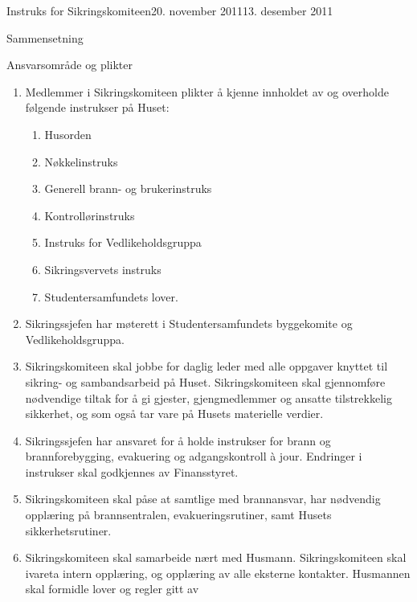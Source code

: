 \documentclass[../fsbok.tex]{subfiles}
\begin{document}
\begin{instruks}{Instruks for Sikringskomiteen}{20. november 2011}{13. desember 2011}
\begin{instruksledd}{Sammensetning}
\begin{enumerate}
	
        \end{enumerate}
    \end{instruksledd}

    \begin{instruksledd}{Ansvarsområde og plikter}
        \begin{enumerate}
            \item Medlemmer i Sikringskomiteen plikter å kjenne innholdet av og overholde
                følgende instrukser på Huset:
                \begin{enumerate}
                    \item Husorden
		    \item Nøkkelinstruks
                    \item Generell brann- og brukerinstruks 
                    \item Kontrollørinstruks
                    \item Instruks for Vedlikeholdsgruppa
                    \item Sikringsvervets instruks
                    \item Studentersamfundets lover.
                \end{enumerate}
            \item Sikringssjefen har møterett i Studentersamfundets byggekomite og
                Vedlikeholdsgruppa.
            \item Sikringskomiteen skal jobbe for daglig leder med alle oppgaver knyttet
                til sikring- og sambandsarbeid på Huset.
                Sikringskomiteen skal gjennomføre nødvendige tiltak for å gi gjester,
                gjengmedlemmer og ansatte
                tilstrekkelig sikkerhet, og som også tar vare på Husets materielle
                verdier.
            \item Sikringssjefen har ansvaret for å holde instrukser for brann og
                brannforebygging, evakuering og
                adgangskontroll à jour. Endringer i instrukser skal godkjennes av
                Finansstyret.
            \item Sikringskomiteen skal påse at samtlige med brannansvar, har nødvendig
                opplæring på brannsentralen,
                evakueringsrutiner, samt Husets sikkerhetsrutiner.
            \item Sikringskomiteen skal samarbeide nært med Husmann. Sikringskomiteen skal ivareta
                intern opplæring, og opplæring av alle eksterne kontakter. Husmannen skal
                formidle lover og regler gitt av

\end{enumerate}
\end{instruksledd}
\end{instruks}
\end{document}
